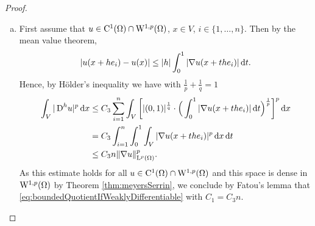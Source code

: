 \begin{proof}
  \begin{enumerate}[a)]
    \item First assume that $u \in \mathrm{C}^1(\Omega) \cap \mathrm{W}^{1,p}(\Omega)$, $x \in V$, $i \in \{1,\dots,n\}$.
      Then by the mean value theorem,
      $$
      |u(x + he_i) - u(x)| \leq |h| \int_0^1 |\nabla u(x + th e_i)| \, {\operatorname{d}\!{t}}.
      $$
      Hence, by Hölder's inequality we have with $\frac{1}{p} + \frac{1}{q} = 1$
      \begin{align*}
        \int_V |\,{\operatorname{D}}^h u|^p \, {\operatorname{d}\!{x}}
        &\leq C_3 \sum_{i = 1}^n \int_V \bigg[ |(0,1)|^{\frac{1}{q}} \cdot \Big( \int_0^1 |\nabla u(x + the_i)| \, {\operatorname{d}\!{t}} \Big)^{\frac{1}{p}} \bigg]^p \, {\operatorname{d}\!{x}} \\
        &= C_3 \int_{i = 1}^n \int_0^1 \int_V |\nabla u(x + the_i)|^p \, {\operatorname{d}\!{x}} \, {\operatorname{d}\!{t}} \\
        &\leq C_3 n \|\nabla u\|^p_{\mathrm{L}^p(\Omega)}.
      \end{align*}
      As this estimate holds for all $u \in \mathrm{C}^1(\Omega) \cap \mathrm{W}^{1,p}(\Omega)$ and this space is dense in $\mathrm{W}^{1,p}(\Omega)$ by Theorem \ref{thm:meyersSerrin}, we conclude by Fatou's lemma that \eqref{eq:boundedQuotientIfWeaklyDifferentiable} with $C_1 = C_3 n$.


\end{enumerate}
\end{proof}
